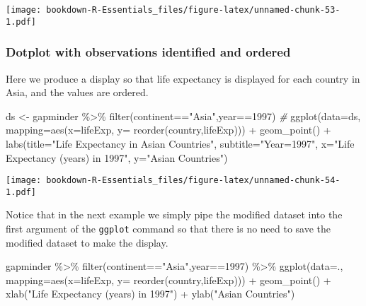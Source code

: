 \documentclass[
]{book}
\newenvironment{Shaded}{\begin{snugshade}}{\end{snugshade}}
\newcommand{\AttributeTok}[1]{\textcolor[rgb]{0.77,0.63,0.00}{#1}}
\newcommand{\CommentTok}[1]{\textcolor[rgb]{0.56,0.35,0.01}{\textit{#1}}}
\newcommand{\DecValTok}[1]{\textcolor[rgb]{0.00,0.00,0.81}{#1}}
\newcommand{\FunctionTok}[1]{\textcolor[rgb]{0.00,0.00,0.00}{#1}}
\newcommand{\NormalTok}[1]{#1}
\newcommand{\OtherTok}[1]{\textcolor[rgb]{0.56,0.35,0.01}{#1}}
\newcommand{\SpecialCharTok}[1]{\textcolor[rgb]{0.00,0.00,0.00}{#1}}
\newcommand{\StringTok}[1]{\textcolor[rgb]{0.31,0.60,0.02}{#1}}
\begin{document}
\texttt{[image: bookdown-R-Essentials\_files/figure-latex/unnamed-chunk-53-1.pdf]}

\hypertarget{dotplot-with-observations-identified-and-ordered}{%
\subsubsection{Dotplot with observations identified and ordered}\label{dotplot-with-observations-identified-and-ordered}}

Here we produce a display so that life expectancy is displayed for each country in Asia, and the values are ordered.

\begin{Shaded}
\begin{Highlighting}[]
\NormalTok{ds }\OtherTok{\textless{}{-}}\NormalTok{ gapminder }\SpecialCharTok{\%\textgreater{}\%} 
  \FunctionTok{filter}\NormalTok{(continent}\SpecialCharTok{==}\StringTok{"Asia"}\NormalTok{,year}\SpecialCharTok{==}\DecValTok{1997}\NormalTok{) }
\CommentTok{\#  }
\FunctionTok{ggplot}\NormalTok{(}\AttributeTok{data=}\NormalTok{ds, }\AttributeTok{mapping=}\FunctionTok{aes}\NormalTok{(}\AttributeTok{x=}\NormalTok{lifeExp, }\AttributeTok{y=} \FunctionTok{reorder}\NormalTok{(country,lifeExp))) }\SpecialCharTok{+} 
  \FunctionTok{geom\_point}\NormalTok{() }\SpecialCharTok{+} 
  \FunctionTok{labs}\NormalTok{(}\AttributeTok{title=}\StringTok{"Life Expectancy in Asian Countries"}\NormalTok{,}
       \AttributeTok{subtitle=}\StringTok{"Year=1997"}\NormalTok{,}
       \AttributeTok{x=}\StringTok{"Life Expectancy (years) in 1997"}\NormalTok{,}
       \AttributeTok{y=}\StringTok{"Asian Countries"}\NormalTok{)}
\end{Highlighting}
\end{Shaded}

\texttt{[image: bookdown-R-Essentials\_files/figure-latex/unnamed-chunk-54-1.pdf]}

Notice that in the next example we simply pipe the modified dataset into the first argument of the \texttt{ggplot} command so that there is no need to save the modified dataset to make the display.

\begin{Shaded}
\begin{Highlighting}[]
\NormalTok{gapminder }\SpecialCharTok{\%\textgreater{}\%} 
  \FunctionTok{filter}\NormalTok{(continent}\SpecialCharTok{==}\StringTok{"Asia"}\NormalTok{,year}\SpecialCharTok{==}\DecValTok{1997}\NormalTok{) }\SpecialCharTok{\%\textgreater{}\%}
\FunctionTok{ggplot}\NormalTok{(}\AttributeTok{data=}\NormalTok{., }\AttributeTok{mapping=}\FunctionTok{aes}\NormalTok{(}\AttributeTok{x=}\NormalTok{lifeExp, }\AttributeTok{y=} \FunctionTok{reorder}\NormalTok{(country,lifeExp))) }\SpecialCharTok{+} 
  \FunctionTok{geom\_point}\NormalTok{() }\SpecialCharTok{+} 
  \FunctionTok{xlab}\NormalTok{(}\StringTok{"Life Expectancy (years) in 1997"}\NormalTok{) }\SpecialCharTok{+} 
  \FunctionTok{ylab}\NormalTok{(}\StringTok{"Asian Countries"}\NormalTok{)}
\end{Highlighting}
\end{Shaded}
\end{document}
